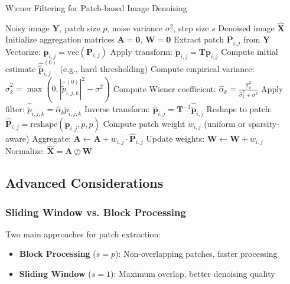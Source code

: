 \documentclass[12pt]{article}
\renewcommand{\vec}[1]{\mathbf{#1}}
\theoremstyle{definition}
\begin{document}
\begin{algorithm}
    \caption{Wiener Filtering for Patch-based Image Denoising}
    \begin{algorithmic}[1]
        \Require Noisy image $\mathbf{Y}$, patch size $p$, noise variance $\sigma^2$, step size $s$
        \Ensure Denoised image $\hat{\mathbf{X}}$
        \State Initialize aggregation matrices $\mathbf{A} = \mathbf{0}$, $\mathbf{W} = \mathbf{0}$
        \State Extract patch $\mathbf{P}_{i,j}$ from $\mathbf{Y}$
        \State Vectorize: $\vec{p}_{i,j} = \text{vec}(\mathbf{P}_{i,j})$
        \State Apply transform: $\tilde{\vec{p}}_{i,j} = \mathbf{T}\vec{p}_{i,j}$
        \State Compute initial estimate $\hat{\tilde{\vec{p}}}_{i,j}^{(0)}$ (e.g., hard thresholding)
        \State Compute empirical variance: $\hat{\sigma}_k^2 = \max(0, |\hat{\tilde{p}}_{i,j,k}^{(0)}|^2 - \sigma^2)$
        \State Compute Wiener coefficient: $\hat{\alpha}_k = \frac{\hat{\sigma}_k^2}{\hat{\sigma}_k^2 + \sigma^2}$
        \State Apply filter: $\hat{\tilde{p}}_{i,j,k} = \hat{\alpha}_k \tilde{p}_{i,j,k}$
        \EndFor
        \State Inverse transform: $\hat{\vec{p}}_{i,j} = \mathbf{T}^{-1}\hat{\tilde{\vec{p}}}_{i,j}$
        \State Reshape to patch: $\hat{\mathbf{P}}_{i,j} = \text{reshape}(\hat{\vec{p}}_{i,j}, p, p)$
        \State Compute patch weight $w_{i,j}$ (uniform or sparsity-aware)
        \State Aggregate: $\mathbf{A} \leftarrow \mathbf{A} + w_{i,j} \cdot \hat{\mathbf{P}}_{i,j}$
        \State Update weights: $\mathbf{W} \leftarrow \mathbf{W} + w_{i,j}$
        \EndFor
        \State Normalize: $\hat{\mathbf{X}} = \mathbf{A} \oslash \mathbf{W}$ 
    \end{algorithmic}
\end{algorithm}

\subsection{Advanced Considerations}
\label{subsec:advanced_considerations}

\subsubsection{Sliding Window vs. Block Processing}
\label{subsubsec:sliding_window}

Two main approaches for patch extraction:

\begin{itemize}[leftmargin=*]
    \item \textbf{Block Processing} ($s = p$): Non-overlapping patches, faster processing
    \item \textbf{Sliding Window} ($s = 1$): Maximum overlap, better denoising quality
\end{itemize}
\end{document}

